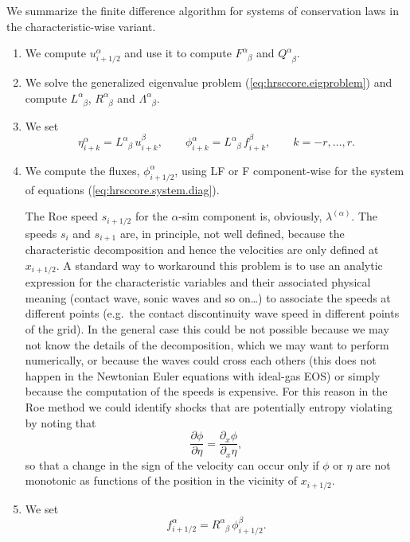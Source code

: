 We summarize the finite difference algorithm for systems of conservation laws in
the characteristic-wise variant.
\begin{enumerate}
  \item We compute $u_{i+1/2}^\alpha$ and use it to compute
  $F^\alpha_{\phantom{\alpha}\beta}$ and $Q^\alpha_{\phantom{\alpha}\beta}$.
  \item We solve the generalized eigenvalue problem
  (\ref{eq:hrsccore.eigproblem}) and compute $L^\alpha_{\phantom{\alpha}\beta}$,
  $R^\alpha_{\phantom{\alpha}\beta}$ and
  $\Lambda^\alpha_{\phantom{\alpha}\beta}$.
  \item We set
  \[
    \eta_{i+k}^\alpha = L^\alpha_{\phantom{\alpha}\beta}\, u^\beta_{i+k},
    \qquad \phi_{i+k}^\alpha = L^\alpha_{\phantom{\alpha}\beta}\,
    f^\beta_{i+k}, \qquad k = -r, \ldots, r.
  \]
  \item We compute the fluxes, $\phi_{i+1/2}^\alpha$, using LF or F
  component-wise for the system of equations (\ref{eq:hrsccore.system.diag}).

  The Roe speed $s_{i+1/2}$ for the $\alpha$-sim component is, obviously,
  $\lambda^{(\alpha)}$. The speeds $s_i$ and $s_{i+1}$ are, in principle, not
  well defined, because the characteristic decomposition and hence the
  velocities are only defined at $x_{i+1/2}$. A standard way to workaround this
  problem is to use an analytic expression for the characteristic variables and
  their associated physical meaning (contact wave, sonic waves and so on\ldots)
  to associate the speeds at different points (e.g.~the contact discontinuity
  wave speed in different points of the grid). In the general case this could be
  not possible because we may not know the details of the decomposition, which
  we may want to perform numerically, or because the waves could cross each
  others (this does not happen in the Newtonian Euler equations with ideal-gas
  EOS) or simply because the computation of the speeds is expensive.  For this
  reason in the Roe method we could identify shocks that are potentially entropy
  violating by noting that
  \[
    \frac{\partial \phi}{\partial \eta} = \frac{\partial_x \phi}{\partial_x
    \eta},
  \]
  so that a change in the sign of the velocity can occur only if $\phi$ or
  $\eta$ are not monotonic as functions of the position in the vicinity of
  $x_{i+1/2}$.
  \item We set
  \[
    f^\alpha_{i+1/2} = R^\alpha_{\phantom{\alpha}\beta}\, \phi^\beta_{i+1/2}.
  \]
\end{enumerate}

